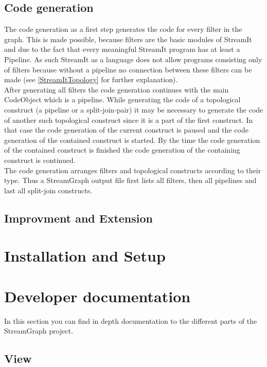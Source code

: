 \documentclass[journal]{IEEEtran}
\begin{document}
\subsection{Code generation}
\noindent The code generation as a first step generates the code for every
filter in the graph. This is made possible, because filters are the basic
modules of StreamIt and due to the fact that every meaningful StreamIt program
has at least a Pipeline.  As such StreamIt as a language does not allow programs
consisting only of filters because without a pipeline no connection between
these filters can be made (see \ref{StreamItTopology} for further
explanation).\\
After generating all filters the code generation continues with the main
CodeObject which is a pipeline. While generating the code of a topological
construct (a pipeline or a split-join-pair) it may be necessary to generate the
code of another such topological construct since it is a part of the first
construct. In that case the code generation of the current construct is paused
and the code generation of the contained construct is started. By the time the
code generation of the contained construct is finished the code generation of
the containing construct is continued.\\
The code generation arranges filters and topological constructs according to
their type. Thus a StreamGraph output file first lists all filters, then all
pipelines and last all split-join constructs.\\

\subsection{Improvment and Extension}



\section{Installation and Setup}



\section{Developer documentation}
\noindent In this section you can find in depth documentation to the different
parts of the StreamGraph project.
\subsection{View}
\end{document}
